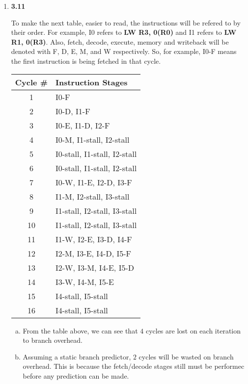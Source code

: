 \documentclass[10pt]{article} %
\begin{document}
\begin{enumerate}
\newpage

\item %

\textbf{3.11}

To make the next table, easier to read, the instructions will be refered to by their order.  For example, I0 refers to \textbf{LW R3, 0(R0)} and I1 refers to \textbf{LW R1, 0(R3)}.  Also, fetch, decode, execute, memory and writeback will be denoted with F, D, E, M, and W respectively.  So, for example, I0-F means the first instruction is being fetched in that cycle.  

\begin{center}
\begin{tabular}{| c | l |}
\hline
Cycle \# & Instruction Stages \\
\hline
1 & I0-F \\
2 & I0-D, I1-F \\
3 & I0-E, I1-D, I2-F \\
4 & I0-M, I1-stall, I2-stall \\
5 & I0-stall, I1-stall, I2-stall \\
6 & I0-stall, I1-stall, I2-stall \\
7 & I0-W, I1-E, I2-D, I3-F \\
8 & I1-M, I2-stall, I3-stall \\
9 & I1-stall, I2-stall, I3-stall \\
10 & I1-stall, I2-stall, I3-stall \\
11 & I1-W, I2-E, I3-D, I4-F \\
12 & I2-M, I3-E, I4-D, I5-F \\
13 & I2-W, I3-M, I4-E, I5-D \\
14 & I3-W, I4-M, I5-E \\
15 & I4-stall, I5-stall \\
16 & I4-stall, I5-stall \\
\hline
\end{tabular}
\end{center}

\begin{enumerate}[(a)]
\item %

From the table above, we can see that $4$ cycles are lost on each iteration to branch overhead.  

\item %

Assuming a static branch predictor, $2$ cycles will be wasted on branch overhead.  This is because the fetch/decode stages still must be performec before any prediction can be made.  


\end{enumerate}
\end{enumerate}
\end{document}
